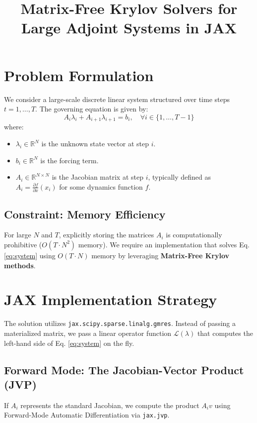 \documentclass{article}
\title{Matrix-Free Krylov Solvers for Large Adjoint Systems in JAX}
\author{}
\date{}
\begin{document}
\maketitle

\section{Problem Formulation}

We consider a large-scale discrete linear system structured over time steps $t = 1, \dots, T$. The governing equation is given by:
\begin{equation}
    A_i \lambda_i + A_{i+1} \lambda_{i+1} = b_i, \quad \forall i \in \{1, \dots, T-1\}
    \label{eq:system}
\end{equation}
where:
\begin{itemize}
    \item $\lambda_i \in \mathbb{R}^N$ is the unknown state vector at step $i$.
    \item $b_i \in \mathbb{R}^N$ is the forcing term.
    \item $A_i \in \mathbb{R}^{N \times N}$ is the Jacobian matrix at step $i$, typically defined as $A_i = \frac{\partial f}{\partial x}(x_i)$ for some dynamics function $f$.
\end{itemize}

\subsection{Constraint: Memory Efficiency}
For large $N$ and $T$, explicitly storing the matrices $A_i$ is computationally prohibitive ($O(T \cdot N^2)$ memory). We require an implementation that solves Eq. \eqref{eq:system} using $O(T \cdot N)$ memory by leveraging \textbf{Matrix-Free Krylov methods}.

\section{JAX Implementation Strategy}

The solution utilizes \texttt{jax.scipy.sparse.linalg.gmres}. Instead of passing a materialized matrix, we pass a linear operator function $\mathcal{L}(\lambda)$ that computes the left-hand side of Eq. \eqref{eq:system} on the fly.

\subsection{Forward Mode: The Jacobian-Vector Product (JVP)}
If $A_i$ represents the standard Jacobian, we compute the product $A_i v$ using Forward-Mode Automatic Differentiation via \texttt{jax.jvp}.
\end{document}
